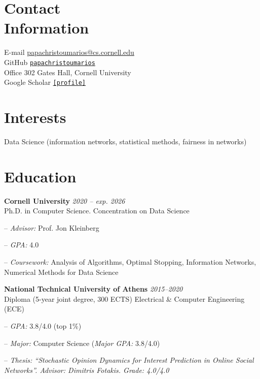 \documentclass[margin, 10pt]{res}
\newcommand{\field}[2]{\noindent \textbf{#1} \hfill #2 \\}
\newcommand{\specialurl}[2]{\href { #2 } {\nolinkurl{[#1]}}}
\begin{document}
\begin{resume}

\section{Contact \\ Information} 
E-mail \hfill \url{papachristoumarios@cs.cornell.edu} \\
GitHub \hfill \href{http://github.com/papachristoumarios}{\nolinkurl{papachristoumarios}} \\
Office \hfill 302 Gates Hall, Cornell University \\
Google Scholar \hfill \specialurl{profile}{https://scholar.google.gr/citations?user=T12JO3MAAAAJ&hl=en}


\section{Interests} Data Science (information networks, statistical methods, fairness in networks)

\section{Education}
\field {Cornell University} {\emph{2020 -- exp. 2026}}
Ph.D. in Computer Science. Concentration on Data Science
\begin{compactitem}
\item[--] \emph{Advisor:} Prof. Jon Kleinberg
\item[--] \emph{GPA:} 4.0
\item[--] \emph{Coursework:} Analysis of Algorithms, Optimal Stopping, Information Networks, Numerical Methods for Data Science
\end{compactitem} 
 
\field{National Technical University of Athens}  {\emph{2015--2020}} 
Diploma (5-year joint degree, 300 ECTS) Electrical \& Computer Engineering (ECE)
\begin{compactitem}
\item[--] \emph{GPA:} 3.8/4.0 (top 1\%)
\item[--] \emph{Major:} Computer Science (\emph{Major GPA:} 3.8/4.0)
\item[--] \emph{Thesis: ``Stochastic Opinion Dynamics for Interest Prediction in Online Social Networks''. Advisor: Dimitris Fotakis. Grade: 4.0/4.0}
\end{compactitem} 



\end{resume}
\end{document}
